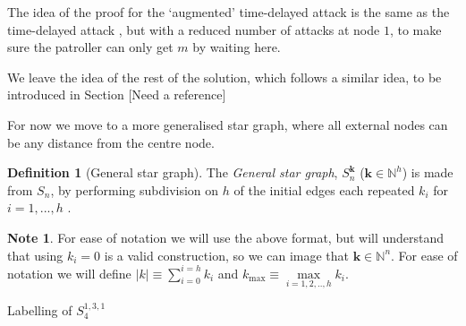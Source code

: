\documentclass[a4paper,10pt]{article}
\theoremstyle{definition}
\newtheorem{definition}[theorem]{Definition}
\theoremstyle{definition}
\theoremstyle{remark}
\theoremstyle{definition}
\newtheorem*{note}{Note}
\begin{document}
The idea of the proof for the `augmented' time-delayed attack is the same as the time-delayed attack , but with a reduced number of attacks at node $1$, to make sure the patroller can only get $m$ by waiting here.

We leave the idea of the rest of the solution, which follows a similar idea, to be introduced in Section [Need a reference]

For now we move to a more generalised star graph, where all external nodes can be any distance from the centre node.

\begin{definition}[General star graph]
The \textit{General star graph}, $S^{\bm{k}}_{n}$ ($\bm{k} \in \mathbb{N}^{h}$) is made from $S_{n}$, by performing subdivision on $h$ of the  initial edges each repeated $k_{i}$ for $i=1,...,h$ . 
\end{definition}

\begin{note}
For ease of notation we will use the above format, but will understand that using $k_{i}=0$ is a valid construction, so we can image that $\bm{k} \in \mathbb{N}^n$.
For ease of notation we will define $ |k| \equiv \sum\limits_{i=0}^{i=h} k_{i}$ and $ k_{\max} \equiv \max\limits_{i=1,2,..,h} k_{i}$.
\end{note}

\begin{myfigure}
\begin{center}
\end{center}
\caption{Labelling of $S^{1,3,1}_{4}$}
\end{myfigure}
\end{document}

